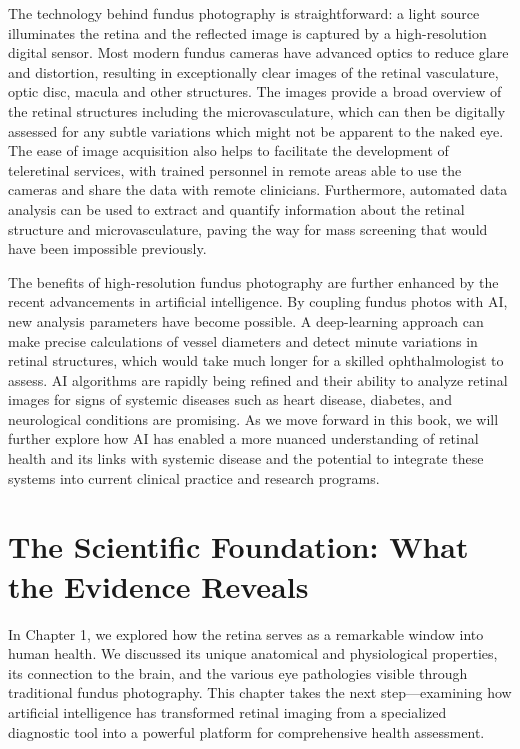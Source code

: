 \documentclass[
  Letterpaper,
]{scrbook}
\begin{document}
The technology behind fundus photography is straightforward: a light
source illuminates the retina and the reflected image is captured by a
high-resolution digital sensor. Most modern fundus cameras have advanced
optics to reduce glare and distortion, resulting in exceptionally clear
images of the retinal vasculature, optic disc, macula and other
structures. The images provide a broad overview of the retinal
structures including the microvasculature, which can then be digitally
assessed for any subtle variations which might not be apparent to the
naked eye. The ease of image acquisition also helps to facilitate the
development of teleretinal services, with trained personnel in remote
areas able to use the cameras and share the data with remote clinicians.
Furthermore, automated data analysis can be used to extract and quantify
information about the retinal structure and microvasculature, paving the
way for mass screening that would have been impossible previously.

The benefits of high-resolution fundus photography are further enhanced
by the recent advancements in artificial intelligence. By coupling
fundus photos with AI, new analysis parameters have become possible. A
deep-learning approach can make precise calculations of vessel diameters
and detect minute variations in retinal structures, which would take
much longer for a skilled ophthalmologist to assess. AI algorithms are
rapidly being refined and their ability to analyze retinal images for
signs of systemic diseases such as heart disease, diabetes, and
neurological conditions are promising. As we move forward in this book,
we will further explore how AI has enabled a more nuanced understanding
of retinal health and its links with systemic disease and the potential
to integrate these systems into current clinical practice and research
programs.


\chapter{The Scientific Foundation: What the Evidence
Reveals}\label{the-scientific-foundation-what-the-evidence-reveals}

In Chapter 1, we explored how the retina serves as a remarkable window
into human health. We discussed its unique anatomical and physiological
properties, its connection to the brain, and the various eye pathologies
visible through traditional fundus photography. This chapter takes the
next step---examining how artificial intelligence has transformed
retinal imaging from a specialized diagnostic tool into a powerful
platform for comprehensive health assessment.
\end{document}
